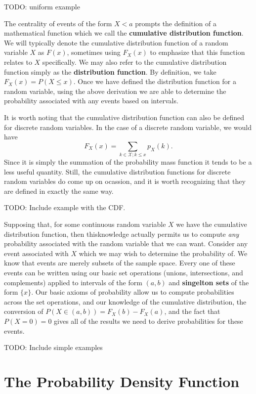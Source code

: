 \documentclass[
  letterpaper,
  DIV=11,
  numbers=noendperiod]{scrreprt}
\begin{document}
TODO: uniform example

The centrality of events of the form \(X<a\) prompts the definition of a
mathematical function which we call the \textbf{cumulative distribution
function}. We will typically denote the cumulative distribution function
of a random variable \(X\) as \(F(x)\), sometimes using \(F_X(x)\) to
emphasize that this function relates to \(X\) specifically. We may also
refer to the cumulative distribution function simply as the
\textbf{distribution function}. By definition, we take
\(F_X(x) = P(X\leq x)\). Once we have defined the distribution function
for a random variable, using the above derivation we are able to
determine the probability associated with any events based on intervals.

It is worth noting that the cumulative distribution function can also be
defined for discrete random variables. In the case of a discrete random
variable, we would have
\[F_X(x) = \sum_{k \in\mathcal{X}; k \leq x} p_X(k).\] Since it is
simply the summation of the probability mass function it tends to be a
less useful quantity. Still, the cumulative distribution functions for
discrete random variables do come up on ocassion, and it is worth
recognizing that they are defined in exactly the same way.

TODO: Include example with the CDF.

Supposing that, for some continuous random variable \(X\) we have the
cumulative distribution function, then thisknowledge actually permits us
to compute \emph{any} probability associated with the random variable
that we can want. Consider any event associated with \(X\) which we may
wish to determine the probability of. We know that events are merely
subsets of the sample space. Every one of these events can be written
using our basic set operations (unions, intersections, and complements)
applied to intervals of the form \((a,b)\) and \textbf{singelton sets}
of the form \(\{x\}\). Our basic axioms of probability allow us to
compute probabilities across the set operations, and our knowledge of
the cumulative distribution, the conversion of
\(P(X \in (a,b)) = F_X(b) - F_X(a)\), and the fact that \(P(X=0) = 0\)
gives all of the results we need to derive probabilities for these
events.

TODO: Include simple examples

\section{The Probability Density
Function}\label{the-probability-density-function}
\end{document}
